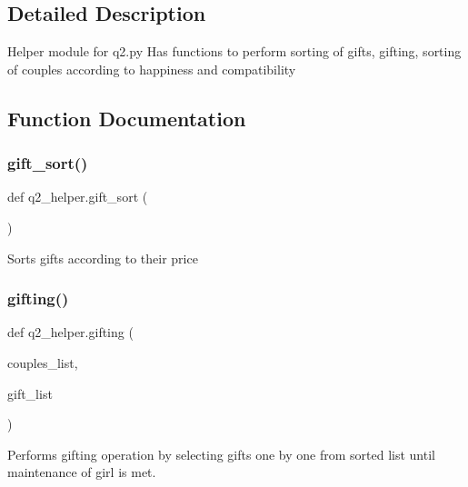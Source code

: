 \subsection{Detailed Description}
\begin{DoxyVerb}Helper module for q2.py
Has functions to perform sorting of gifts, gifting, sorting of couples according to happiness and compatibility\end{DoxyVerb}
 

\subsection{Function Documentation}
\mbox{\label{namespaceq2__helper_a8b3d3b435300fd1f72d5dcf384d378ae}} 
\subsubsection{\texorpdfstring{gift\+\_\+sort()}{gift\_sort()}}
{\footnotesize\ttfamily def q2\+\_\+helper.\+gift\+\_\+sort (\begin{DoxyParamCaption}{ }\end{DoxyParamCaption})}

\begin{DoxyVerb}Sorts gifts according to their price
\end{DoxyVerb}
 \mbox{\label{namespaceq2__helper_ac0013034c33667bd83f64de880d2d177}} 
\subsubsection{\texorpdfstring{gifting()}{gifting()}}
{\footnotesize\ttfamily def q2\+\_\+helper.\+gifting (\begin{DoxyParamCaption}\item[{}]{couples\+\_\+list,  }\item[{}]{gift\+\_\+list }\end{DoxyParamCaption})}

\begin{DoxyVerb}Performs gifting operation by selecting gifts one by one from sorted list until maintenance of girl is met.
\end{DoxyVerb}
 